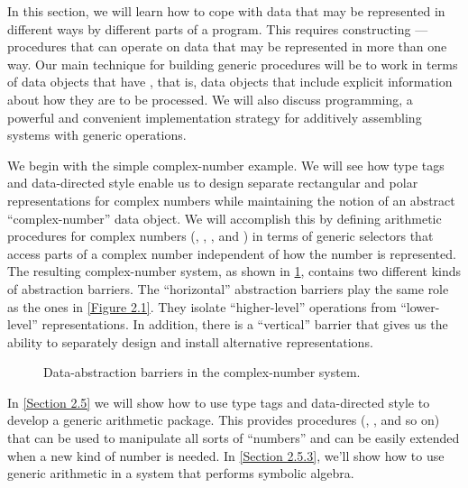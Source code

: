In this section, we will learn how to cope with data that may be represented in different ways by different parts of a program.
This requires constructing ---procedures that can operate on data that may be represented in more than one way.
Our main technique for building generic procedures will be to work in terms of data objects that have , that is, data objects that include explicit information about how they are to be processed.
We will also discuss  programming, a powerful and convenient implementation strategy for additively assembling systems with generic operations.

We begin with the simple complex-number example.
We will see how type tags and data-directed style enable us to design separate rectangular and polar representations for complex numbers while maintaining the notion of an abstract “complex-number” data object.
We will accomplish this by defining arithmetic procedures for complex numbers (, , , and ) in terms of generic selectors that access parts of a complex number independent of how the number is represented.
The resulting complex-number system, as shown in \cref{Figure 2.19}, contains two different kinds of abstraction barriers.
The “horizontal” abstraction barriers play the same role as the ones in \cref{Figure 2.1}.
They isolate “higher-level” operations from  “lower-level” representations.
In addition, there is a “vertical” barrier that gives us the ability to separately design and install alternative representations.

\begin{figure}[tb]
	\centering
	
	\caption{
		Data-abstraction barriers in the complex-number system.
	}
	\label{Figure 2.19}
\end{figure}

In \cref{Section 2.5} we will show how to use type tags and data-directed style to develop a generic arithmetic package.
This provides procedures (, , and so on) that can be used to manipulate all sorts of “numbers” and can be easily extended when a new kind of number is needed.
In \cref{Section 2.5.3}, we’ll show how to use generic arithmetic in a system that performs symbolic algebra.




